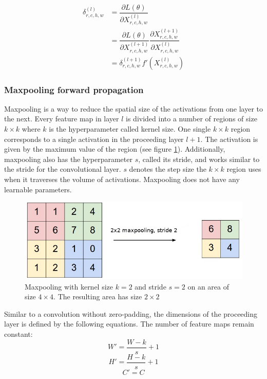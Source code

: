 \documentclass[a4paper,11pt,twoside]{article}
\newcommand*{\pd}[2]{\ensuremath{\dfrac{\partial #1}{\partial #2}}}
\begin{document}
\begin{equation}
\begin{split}
\delta^{(l)}_{r,c,h,w}
		& = \pd{L(\theta)}{X^{(l)}_{r,c,h,w}} \\
		& = \pd{L(\theta)}{X^{(l+1)}_{r,c,h,w}} \pd{X^{(l+1)}_{r,c,h,w}}{X^{(l)}_{r,c,h,w}} \\
		& = \delta^{(l+1)}_{r,c,h,w} f'(X^{(l)}_{r,c,h,w})
\end{split}
\end{equation}

\subsubsection{Maxpooling forward propagation}
Maxpooling is a way to reduce the spatial size of the activations from one layer to the next. Every feature map in layer $l$ is divided into a number of regions of size $k \times k$ where $k$ is the hyperparameter called kernel size. One single $k \times k$ region corresponds to a single activation in the proceeding layer $l+1$. The activation is given by the maximum value of the region (see figure \ref{figmaxpool}). Additionally, maxpooling also has the hyperparameter $s$, called its stride, and works similar to the stride for the convolutional layer. $s$ denotes the step size the $k \times k$ region uses when it traverses the volume of activations. Maxpooling does not have any learnable parameters. \cite{cs231n} \cite{convmath} \cite{convarithmetic}

\begin{figure}[h]
	\centering
  		\includegraphics[scale=0.7]{maxpool.png}
  	\caption{Maxpooling with kernel size $k=2$ and stride $s=2$ on an area of size $4 \times 4$. The resulting area has size $2 \times 2$} \label{figmaxpool}
\end{figure}

Similar to a convolution without zero-padding, the dimensions of the proceeding layer is defined by the following equations. The number of feature maps remain constant: \cite{cs231n} \cite{convmath} \cite{convarithmetic}
\begin{equation}
W' = \frac{W-k}{s}+1
\end{equation}
\begin{equation}
H' = \frac{H-k}{s}+1
\end{equation}
\begin{equation}
C' = C
\end{equation}
\end{document}
